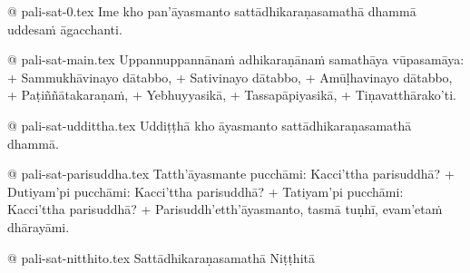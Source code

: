 @ pali-sat-0.tex
Ime kho pan’āyasmanto sattādhikaraṇasamathā dhammā uddesaṁ āgacchanti.

@ pali-sat-main.tex
Uppannuppannānaṁ adhikaraṇānaṁ samathāya vūpasamāya: +
Sammukhāvinayo dātabbo, +
Sativinayo dātabbo, +
Amūḷhavinayo dātabbo, +
Paṭiññātakaraṇaṁ, +
Yebhuyyasikā, +
Tassapāpiyasikā, +
Tiṇavatthārako’ti.

@ pali-sat-uddittha.tex
Uddiṭṭhā kho āyasmanto sattādhikaraṇasamathā dhammā.

@ pali-sat-parisuddha.tex
Tatth’āyasmante pucchāmi: Kacci’ttha parisuddhā? +
Dutiyam’pi pucchāmi: Kacci’ttha parisuddhā? +
Tatiyam’pi pucchāmi: Kacci’ttha parisuddhā? +
Parisuddh’etth’āyasmanto, tasmā tuṇhī, evam’etaṁ dhārayāmi.

@ pali-sat-nitthito.tex
Sattādhikaraṇasamathā Niṭṭhitā
